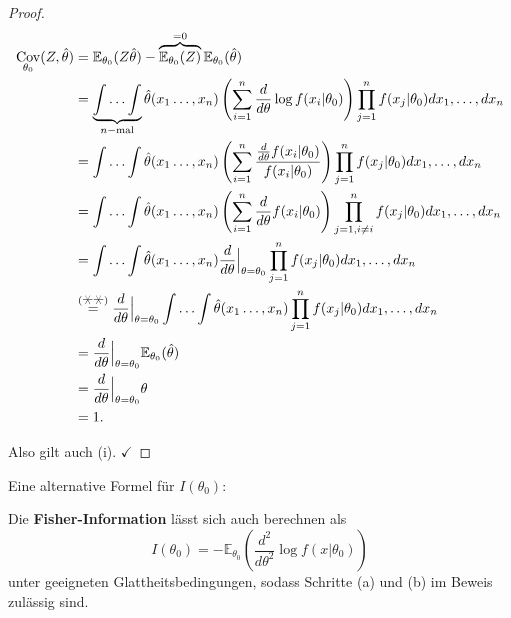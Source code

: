 \documentclass{tstextbook}
\DeclareMathOperator{\Cov}{Cov}
\newcommand{\E}{\mathbb E}
\begin{document}
\begin{proof}
	\[
	\begin{aligned}
		\Cov_{\theta_0}(Z,\hat{\theta}) & = \E_{\theta_0}(Z\hat{\theta})-\overbrace{\E_{\theta_0}(Z)}^{=0}\E_{\theta_0}(\hat{\theta}) \\
		& = \underbrace{\int\ldots\int}_{n-{\text{mal}}}\hat{\theta}(x_1\ldots,x_n)\left(\sum_{i=1}^{n}\frac{d}{d\theta}\log f(x_i|\theta_0)\right)\prod_{j=1}^{n} f(x_j|\theta_0) dx_1,\ldots,dx_n \\
		& = \int\ldots\int\hat{\theta}(x_1\ldots,x_n)\left(\sum_{i=1}^{n}\frac{\frac{d}{d\theta}f(x_i|\theta_0)}{f(x_i|\theta_0)}\right)\prod_{j=1}^{n} f(x_j|\theta_0) dx_1,\ldots,dx_n \\
		& = \int\ldots\int\hat{\theta}(x_1\ldots,x_n)\left(\sum_{i=1}^{n}\frac{d}{d\theta}f(x_i|\theta_0)\right)\prod_{j=1,i\ne i}^{n} f(x_j|\theta_0) dx_1,\ldots,dx_n \\
		& = \int\ldots\int\hat{\theta}(x_1\ldots,x_n)\frac{d}{d\theta}\Big|_{\theta=\theta_0}\prod_{j=1}^{n} f(x_j|\theta_0) dx_1,\ldots,dx_n \\
		& \overset{(\hexstar\hexstar)}{=} \frac{d}{d\theta}\Big|_{\theta=\theta_0} \int\ldots\int\hat{\theta}(x_1\ldots,x_n)\prod_{j=1}^{n} f(x_j|\theta_0) dx_1,\ldots,dx_n \\
		& = \frac{d}{d\theta}\Big|_{\theta=\theta_0} \E_{\theta_0}(\hat{\theta}) \\
		& = \frac{d}{d\theta}\Big|_{\theta=\theta_0} \theta \\
		& = 1.
	\end{aligned}
	\]
	
	Also gilt auch (i). $ \checkmark $
	
\end{proof}


Eine alternative Formel für $ I(\theta_0) $: 

\begin{lemma}
	Die \textbf{Fisher-Information}  lässt sich auch berechnen als 
	\[I(\theta_0)=-\E_{\theta_0}\left(\frac{d^2}{d\theta^2}\log f(x|\theta_0)\right)\] 
	unter geeigneten Glattheitsbedingungen, sodass Schritte (a) und (b) im Beweis zulässig sind.
\end{lemma}
\end{document}
